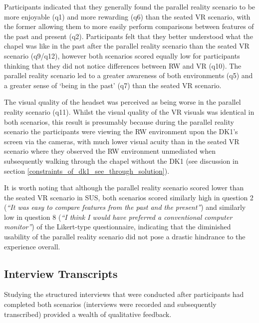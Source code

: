 Participants indicated that they generally found the parallel reality scenario to be more enjoyable (q1) and more rewarding (q6) than the seated VR scenario, with the former allowing them to more easily perform comparisons between features of the past and present (q2). Participants felt that they better understood what the chapel was like in the past after the parallel reality scenario than the seated VR scenario (q9/q12), however both scenarios scored equally low for participants thinking that they did not notice differences between RW and VR (q10). The parallel reality scenario led to a greater awareness of both environments (q5) and a greater sense of `being in the past' (q7) than the seated VR scenario.

The visual quality of the headset was perceived as being worse in the parallel reality scenario (q11). Whilst the visual quality of the VR visuals was identical in both scenarios, this result is presumably because during the parallel reality scenario the participants were viewing the RW environment upon the DK1's screen via the cameras, with much lower visual acuity than in the seated VR scenario where they observed the RW environment unmediated when subsequently walking through the chapel without the DK1 (see discussion in section \ref{constraints_of_dk1_see_through_solution}).

It is worth noting that although the parallel reality scenario scored lower than the seated VR scenario in SUS, both scenarios scored similarly high in question 2 (\textit{``It was easy to compare features from the past and the present''}) and similarly low in question 8 (\textit{``I think I would have preferred a conventional computer monitor''}) of the Likert-type questionnaire, indicating that the diminished usability of the parallel reality scenario did not pose a drastic hindrance to the experience overall.


\subsection{Interview Transcripts}
\label{stage1interviews}
Studying the structured interviews that were conducted after participants had completed both scenarios (interviews were recorded and subsequently transcribed) provided a wealth of qualitative feedback.

